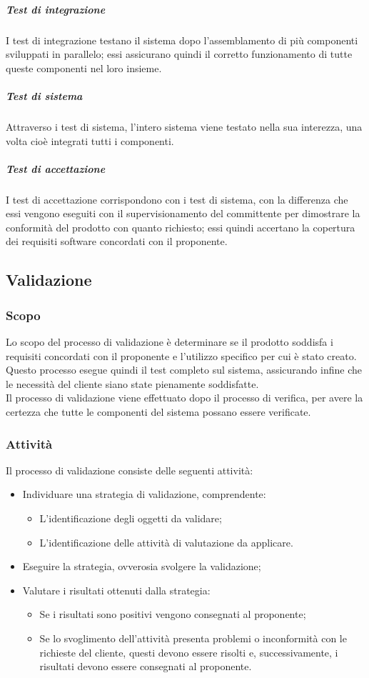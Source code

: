 \documentclass[../norme-di-progetto.tex]{subfiles}
\begin{document}
\subparagraph*{Test di integrazione}
I test di integrazione testano il sistema dopo l'assemblamento di più componenti sviluppati in parallelo; essi assicurano quindi il corretto funzionamento di tutte queste componenti nel loro insieme.

\subparagraph*{Test di sistema}
Attraverso i test di sistema, l'intero sistema viene testato nella sua interezza, una volta cioè integrati tutti i componenti.

\subparagraph*{Test di accettazione}
I test di accettazione corrispondono con i test di sistema, con la differenza che essi vengono eseguiti con il supervisionamento del committente per dimostrare la conformità del prodotto con quanto richiesto; essi quindi accertano la copertura dei requisiti software concordati con il proponente.

\subsection{Validazione}
\subsubsection{Scopo}
Lo scopo del processo di validazione è determinare se il prodotto soddisfa i requisiti concordati con il proponente e l'utilizzo specifico per cui è stato creato. Questo processo esegue quindi il test completo sul sistema, assicurando infine che le necessità del cliente siano state pienamente soddisfatte. \\ Il processo di validazione viene effettuato dopo il processo di verifica, per avere la certezza che tutte le componenti del sistema possano essere verificate.
\subsubsection{Attività}
Il processo di validazione consiste delle seguenti attività:
\begin{itemize}
  \item Individuare una strategia di validazione, comprendente:
  \begin{itemize}
    \item L'identificazione degli oggetti da validare;
    \item L'identificazione delle attività di valutazione da applicare.
  \end{itemize}
  \item Eseguire la strategia, ovverosia svolgere la validazione;
  \item Valutare i risultati ottenuti dalla strategia:
  \begin{itemize}
    \item Se i risultati sono positivi vengono consegnati al proponente;
    \item Se lo svoglimento dell'attività presenta problemi o inconformità con le richieste del cliente, questi devono essere risolti e, successivamente, i risultati devono essere consegnati al proponente.
  \end{itemize}
\end{itemize}
\end{document}
